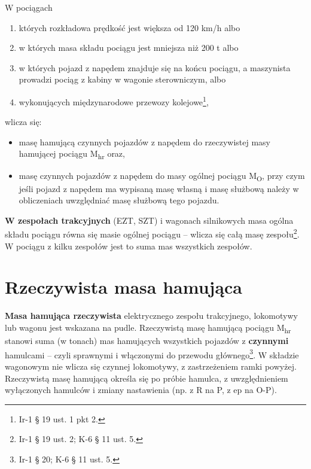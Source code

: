 \begin{tcolorbox}[colback=red!5!white,colframe=red!75!black,title=Uwaga!]
	W pociągach
	\begin{enumerate}
		\item których rozkładowa prędkość jest większa od 120 km/h albo
		\item w których masa składu pociągu jest mniejsza niż 200 t albo
		\item w których pojazd z napędem znajduje się na końcu pociągu, a maszynista prowadzi pociąg z kabiny w wagonie sterowniczym, albo
		\item wykonujących międzynarodowe przewozy kolejowe\footnote{Ir-1 § 19 ust. 1 pkt 2.},
	\end{enumerate}
	wlicza się:
	\begin{itemize}
		\item masę hamującą czynnych pojazdów z napędem do rzeczywistej masy hamującej pociągu M\textsubscript{hr} oraz,
		\item masę czynnych pojazdów z napędem do masy ogólnej pociągu M\textsubscript{O}, przy czym jeśli pojazd z napędem ma wypisaną masę własną i masę służbową należy w obliczeniach uwzględniać masę służbową tego pojazdu.
	\end{itemize}
	\label{def:masa}
\end{tcolorbox}

\textbf{W zespołach trakcyjnych} (EZT, SZT) i wagonach silnikowych masa ogólna składu pociągu równa się masie ogólnej pociągu – wlicza się całą masę zespołu\footnote{Ir-1 § 19 ust. 2; K-6 § 11 ust. 5.}. W pociągu z kilku zespołów jest to suma mas wszystkich zespołów.

\section{Rzeczywista masa hamująca}

\textbf{Masa hamująca rzeczywista} elektrycznego zespołu trakcyjnego, lokomotywy lub wagonu jest wskazana na pudle. Rzeczywistą masę hamującą pociągu M\textsubscript{hr} stanowi suma (w tonach) mas hamujących wszystkich pojazdów z \textbf{czynnymi} hamulcami – czyli sprawnymi i włączonymi do przewodu głównego\footnote{Ir-1 § 20; K-6 § 11 ust. 5.}. W składzie wagonowym nie wlicza się czynnej lokomotywy, z zastrzeżeniem ramki powyżej. Rzeczywistą masę hamującą określa się po próbie hamulca, z uwzględnieniem wyłączonych hamulców i zmiany nastawienia (np. z R na P, z ep na O-P).


